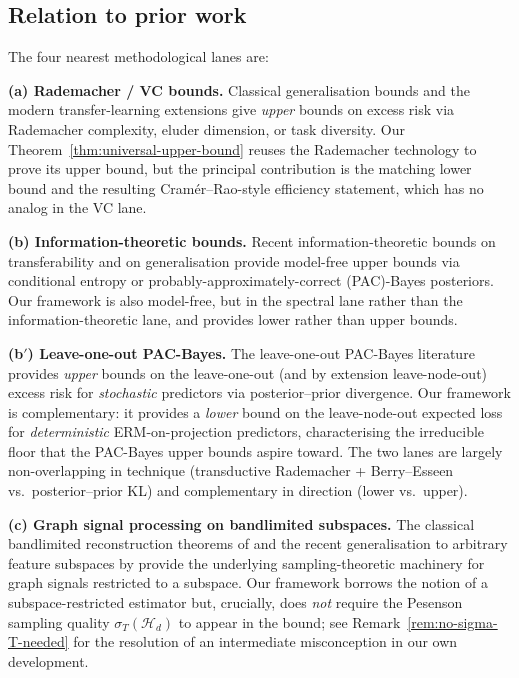 \documentclass[11pt,a4paper]{article}
\theoremstyle{plain}
\theoremstyle{definition}
\theoremstyle{remark}
\newcommand{\Hcal}{\mathcal{H}}
\begin{document}
\subsection{Relation to prior work}
\label{subsec:related-work}

The four nearest methodological lanes are:

\textbf{(a) Rademacher / VC bounds.}  Classical generalisation bounds
\citep{Vapnik1998,Mohri2018book} and the modern transfer-learning
extensions \citep{Tripuraneni2020,Du2020} give \emph{upper} bounds on
excess risk via Rademacher complexity, eluder dimension, or task
diversity.  Our Theorem~\ref{thm:universal-upper-bound} reuses the
Rademacher technology to prove its upper bound, but the principal
contribution is the matching lower bound and the resulting
Cram\'er--Rao-style efficiency statement, which has no analog in the
VC lane.

\textbf{(b) Information-theoretic bounds.}  Recent
information-theoretic bounds on transferability
\citep{Tran2019,Nguyen2023} and on generalisation
\citep{Russo2016,Xu2017} provide model-free upper bounds via conditional
entropy or probably-approximately-correct (PAC)-Bayes posteriors.  Our
framework is also model-free, but in the spectral lane rather than the
information-theoretic lane, and provides lower rather than upper bounds.

\textbf{(b$'$) Leave-one-out PAC-Bayes.}  The leave-one-out PAC-Bayes
literature \citep{LangfordCaruana2002,DziugaiteRoy2017} provides
\emph{upper} bounds on the leave-one-out (and by extension
leave-node-out) excess risk for \emph{stochastic} predictors via
posterior--prior divergence.  Our framework is complementary: it
provides a \emph{lower} bound on the leave-node-out expected loss for
\emph{deterministic} ERM-on-projection predictors, characterising the
irreducible floor that the PAC-Bayes upper bounds aspire toward.  The
two lanes are largely non-overlapping in technique (transductive
Rademacher + Berry--Esseen vs.\ posterior--prior KL) and complementary
in direction (lower vs.\ upper).

\textbf{(c) Graph signal processing on bandlimited subspaces.}  The
classical bandlimited reconstruction theorems of
\citet{Pesenson2008,AnisGaddeOrtega2016} and the recent generalisation
to arbitrary feature subspaces by \citet{ChepuriLeus2018,TanakaEldar2020}
provide the underlying sampling-theoretic machinery for graph signals
restricted to a subspace.  Our framework borrows the notion of a
subspace-restricted estimator but, crucially, does \emph{not} require
the Pesenson sampling quality $\sigma_T(\Hcal_d)$ to appear in the
bound; see Remark~\ref{rem:no-sigma-T-needed} for the resolution of an
intermediate misconception in our own development.
\end{document}

